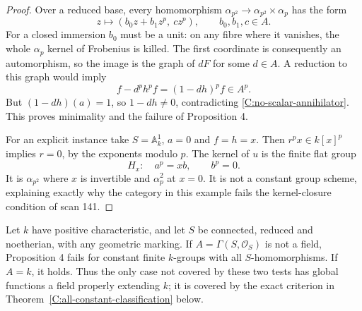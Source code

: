 \begin{proof}
Over a reduced base, every homomorphism
$\alpha_{p^2}\to\alpha_{p^2}\times\alpha_p$ has the form
\[
z\longmapsto (b_0z+b_1z^p,\ c z^p),
\qquad b_0,b_1,c\in A.
\]
For a closed immersion $b_0$ must be a unit: on any fibre where it
vanishes, the whole $\alpha_p$ kernel of Frobenius is killed.
The first coordinate is consequently an automorphism, so the image
is the graph of $dF$ for some $d\in A$.  A reduction to this graph
would imply
\[
f-d^ph^pf=(1-dh)^pf\in A^p.
\]
But $(1-dh)(a)=1$, so $1-dh\ne0$, contradicting
\eqref{C:no-scalar-annihilator}.  This proves minimality and the
failure of Proposition 4.

For an explicit instance take $S=\mathbb A^1_k$, $a=0$ and $f=h=x$.
Then $r^px\in k[x]^p$ implies $r=0$, by the exponents modulo $p$.
The kernel of $u$ is the finite flat group
\[
H_x:\quad a^p=xb,\qquad b^p=0.
\]
It is $\alpha_{p^2}$ where $x$ is invertible and
$\alpha_p^2$ at $x=0$.  It is not a constant group scheme, explaining
exactly why the category in this example fails the kernel-closure
condition of scan 141.
\end{proof}

\begin{corollary}
\label{C:nonfield-all-maps}
Let $k$ have positive characteristic, and let $S$ be connected, reduced
and noetherian, with any geometric marking.  If
$A=\Gamma(S,\mathcal O_S)$ is not a field, Proposition 4 fails for
constant finite $k$-groups with all $S$-homomorphisms.  If $A=k$, it
holds.  Thus the only case not covered by these two tests has global
functions a field properly extending $k$; it is covered by the exact
criterion in Theorem~\ref{C:all-constant-classification} below.
\end{corollary}

